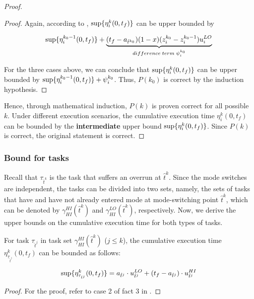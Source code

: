 \documentclass[10pt,journal,compsoc]{IEEEtran}
\begin{document}
\begin{proof}
\begin{proof}
Again, according to , $\sup\{\eta_i^{k}(0,t_f)\}$ can be upper bounded by
\begin{small}
\begin{align*}
\sup\{\eta_i^{k_0-1}(0,t_f)\}+\underbrace{(t_f-a_{\hat{t}^{k_0}})(1-x)(z_i^{k_0}-z_i^{k_0-1}){u_i^{LO}}}_{difference\;term\;\psi_i^{k_0}}
\end{align*}
\end{small}

For the three cases above, we can conclude that $\sup\{\eta_i^{k}(0,t_f)\}$ can be upper bounded by $\sup\{\eta_i^{k_0-1}(0,t_f)\}+\psi_i^{k_0}$. Thus, $P(k_0)$ is correct by the induction hypothesis. 
\end{proof}
Hence, through mathematical induction, $P(k)$ is proven correct for all possible $k$. Under different execution scenarios, the cumulative execution time $\eta_i^{k}(0,t_f)$ can be bounded by the \textbf{intermediate} upper bound $\sup\{\eta_i^{k}(0,t_f)\}$. Since $P(k)$ is correct, the original statement is correct.   
\end{proof}         


\subsubsection{\textbf{Bound for \hi tasks}}
Recall that $\tau_{\hat{t}^k}$ is the \hi task that suffers an overrun at $\hat{t}^k$. Since the mode switches are independent, the \hi tasks can be divided into two sets, namely, the sets of tasks that have and have not already entered \hi mode at mode-switching point $\hat{t}^k$, which can be denoted by $\gamma_{HI}^{HI}(\hat{t}^k)$ and $\gamma_{HI}^{LO}(\hat{t}^k)$, respectively. Now, we derive the upper bounds on the cumulative execution time for both types of \hi tasks.         

\begin{lemma}
\label{lem:hi0}
For \hi task $\tau_{\hat{t}^j}$ in task set $\gamma_{HI}^{HI}(\hat{t}^k)$ ($j\le{k}$), the cumulative execution time $\eta_{\tau_{\hat{t}^j}}^k(0,t_f)$ can be bounded as follows:
\begin{small}
\begin{align}
\label{eq:hi0}
\sup\{\eta_{\tau_{\hat{t}^j}}^k(0,t_f)\} = a_{\hat{t}^j}\cdot{}u_{\hat{t}^j}^{LO}+(t_f-a_{\hat{t}^j})\cdot{}u_{\hat{t}^j}^{HI}
\end{align}
\end{small}
\end{lemma}
\begin{proof}
For the proof, refer to case 2 of fact 3 in \cite{Baruah2012}. 
\end{proof}
\end{document}
